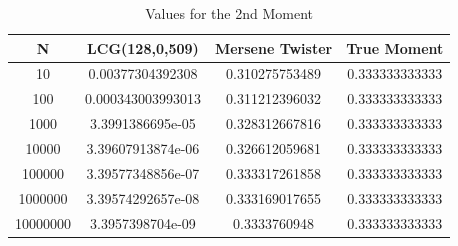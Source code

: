\documentclass[a4paper,11pt]{article}
\begin{document}
\begin{table}[ht]
\centering
\label{1moment}
\begin{tabular}{|c|c|c|c|}
\hline
\textbf{N} & \textbf{LCG(128,0,509)}&\textbf{Mersene Twister}&\textbf{True Moment} \\ \hline
10 & 0.00377304392308 & 0.310275753489 & 0.333333333333 \\
100 & 0.000343003993013 & 0.311212396032 & 0.333333333333 \\
1000 & 3.3991386695e-05 & 0.328312667816 & 0.333333333333 \\
10000 & 3.39607913874e-06 & 0.326612059681 & 0.333333333333 \\
100000 & 3.39577348856e-07 & 0.333317261858 & 0.333333333333 \\
1000000 & 3.39574292657e-08 & 0.333169017655 & 0.333333333333 \\
10000000 & 3.3957398704e-09 & 0.3333760948 & 0.333333333333 \\
\hline
\end{tabular}
\caption{Values for the 2nd Moment}
\end{table}
\end{document}
